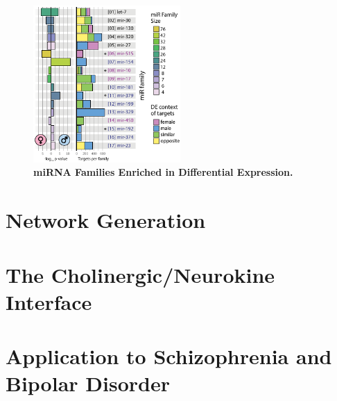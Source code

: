\begin{figure}
\centering
\includegraphics[width=0.5\textwidth]{figures/mir-de-fam}
\caption[Differential Expression miRNA Family Enrichment]{\textbf{miRNA Families Enriched in Differential Expression.}
\label{fig:mir-de-fam}}
\end{figure}


\section{Network Generation}

\section{The Cholinergic/Neurokine Interface}

\section{Application to Schizophrenia and Bipolar Disorder}
